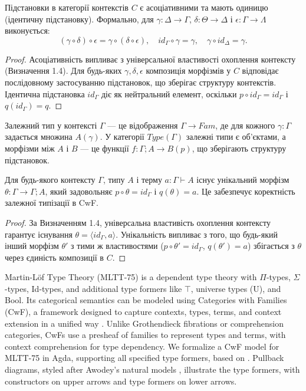 \documentclass{article}
\begin{document}
\begin{theorem}
Підстановки в категорії контекстів $C$ є асоціативними та мають одиницю (ідентичну підстановку). Формально, для $\gamma:\Delta\rightarrow\Gamma$, $\delta:\Theta\rightarrow\Delta$ і $\epsilon:\Gamma\rightarrow\Lambda$ виконується:
\[
    (\gamma \circ \delta) \circ \epsilon = \gamma \circ (\delta \circ \epsilon), \quad id_{\Gamma} \circ \gamma = \gamma, \quad \gamma \circ id_{\Delta} = \gamma.
\]
\end{theorem}

\begin{proof}
Асоціативність випливає з універсальної властивості охоплення контексту (Визначення 1.4). Для будь-яких $\gamma,\delta,\epsilon$ композиція морфізмів у $C$ відповідає послідовному застосуванню підстановок, що зберігає структуру контекстів. Ідентична підстановка $id_{\Gamma}$ діє як нейтральний елемент, оскільки $p \circ id_{\Gamma} = id_{\Gamma}$ і $q(id_{\Gamma}) = q$.
\end{proof}

\begin{definition}
Залежний тип у контексті $\Gamma$ --- це відображення $\Gamma \rightarrow Fam$, де для кожного $\gamma:\Gamma$ задається множина $A(\gamma)$. У категорії $Type(\Gamma)$ залежні типи є об’єктами, а морфізми між $A$ і $B$ --- це функції $f: \Gamma;A \rightarrow B(p)$, що зберігають структуру підстановок.
\end{definition}

\begin{theorem}
Для будь-якого контексту $\Gamma$, типу $A$ і терму $a:\Gamma\vdash A$ існує унікальний морфізм $\theta:\Gamma \rightarrow \Gamma;A$, який задовольняє $p \circ \theta = id_{\Gamma}$ і $q(\theta) = a$. Це забезпечує коректність залежної типізації в CwF.
\end{theorem}

\begin{proof}
За Визначенням 1.4, універсальна властивість охоплення контексту гарантує існування $\theta = \langle id_{\Gamma}, a \rangle$. Унікальність випливає з того, що будь-який інший морфізм $\theta'$ з тими ж властивостями ($p \circ \theta' = id_{\Gamma}$, $q(\theta') = a$) збігається з $\theta$ через єдиність композиції в $C$.
\end{proof}

Martin-Löf Type Theory (MLTT-75) is a dependent type theory with $\Pi$-types, $\Sigma$-types, Id-types, and additional type formers like $\top$, universe types (U), and Bool. Its categorical semantics can be modeled using Categories with Families (CwF), a framework designed to capture contexts, types, terms, and context extension in a unified way \cite{awodey2019, ncatlab}. Unlike Grothendieck fibrations or comprehension categories, CwFs use a presheaf of families to represent types and terms, with context comprehension for type dependency. We formalize a CwF model for MLTT-75 in Agda, supporting all specified type formers, based on \cite{awodey2019}. Pullback diagrams, styled after Awodey’s natural models \cite{awodey}, illustrate the type formers, with constructors on upper arrows and type formers on lower arrows.
\end{document}
